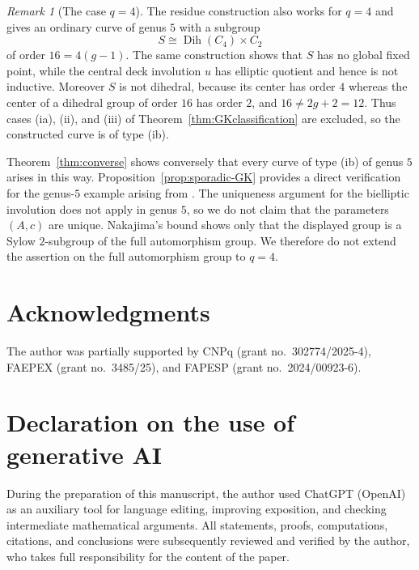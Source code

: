 \documentclass[11pt]{article}
\theoremstyle{remark}
\newtheorem{remark}[theorem]{Remark}
\newcommand{\Dih}{\operatorname{Dih}}
\begin{document}
\begin{remark}[The case $q=4$]\label{rem:smallq}
The residue construction also works for $q=4$ and gives an ordinary
curve of genus $5$ with a subgroup
\[
        S\cong\Dih(C_4)\times C_2
\]
of order $16=4(g-1)$.  The same construction shows that $S$ has no
global fixed point, while the central deck involution $u$ has elliptic
quotient and hence is not inductive.  Moreover $S$ is not dihedral,
because its center has order $4$ whereas the center of a dihedral group
of order $16$ has order $2$, and $16\ne2g+2=12$.  Thus cases
\textup{(ia)}, \textup{(ii)}, and \textup{(iii)} of
Theorem~\ref{thm:GKclassification} are excluded, so the constructed
curve is of type \textup{(ib)}.

Theorem~\ref{thm:converse} shows conversely that every curve of type
\textup{(ib)} of genus $5$ arises in this way.  Proposition~\ref{prop:sporadic-GK}
provides a direct verification for the genus-$5$ example arising from
\cite[Sections~6.4--6.5]{GK2015}.  The uniqueness argument for the
bielliptic involution does not apply in genus $5$, so we do not claim
that the parameters $(A,c)$ are unique.  Nakajima's bound shows only
that the displayed group is a Sylow $2$-subgroup of the full
automorphism group.  We therefore do not extend the assertion on the
full automorphism group to $q=4$.
\end{remark}



\section*{Acknowledgments}

The author was partially supported by CNPq (grant no.~302774/2025-4),
FAEPEX (grant no.~3485/25), and FAPESP (grant no.~2024/00923-6).

\section*{Declaration on the use of generative AI}

During the preparation of this manuscript, the author used ChatGPT (OpenAI) as an auxiliary tool for language editing, improving exposition, and checking intermediate mathematical arguments. All statements, proofs, computations, citations, and conclusions were subsequently reviewed and verified by the author, who takes full responsibility for the content of the paper.
\end{document}

